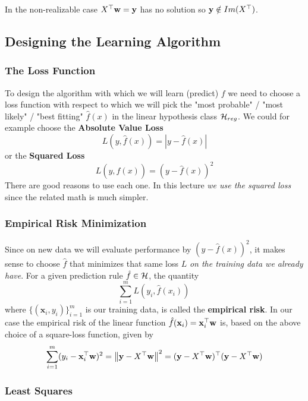 In the non-realizable case $X^{\top} \mathbf{w}=\mathbf{y}$ has no solution so $\mathbf{y}\notin Im(X^{\top})$.





\subsection{Designing the Learning Algorithm}

\subsubsection{The Loss Function}

To design the algorithm with which we will learn (predict) $f$ we need to choose a loss function with respect to which we will pick the "most probable" / "most likely" / "best fitting" $\hat{f}(x)$ in the linear hypothesis class $\mathcal{H}_{reg}$. We could for example choose the \textbf{Absolute Value Loss}
     \[
      L(y,\hat{f}(x)) = |y - \hat{f}(x)|
     \]
     or the \textbf{Squared Loss}
     \[
      L(y,\hat{f}(x)) = (y - \hat{f}(x))^2
     \]
There are good reasons to use each one. In this lecture \textit{we use the squared loss} since the related math is much simpler.



\subsubsection{Empirical Risk Minimization}

Since on new data we will evaluate performance by $(y-\hat{f}(x))^2$, it makes sense to choose $\hat{f}$ that minimizes that same loss $L$ \textit{on the training data we already have}.
 For a given prediction rule $\hat{f}\in\mathcal{H}$, the quantity
  \[
   \sum_{i=1}^m L(y_i,\hat{f}(x_i))\,
   \]
where $\{(\mathbf{x}_i,y_i)\}_{i=1}^m$ is our training data, is called the \textbf{empirical risk}. In our case the empirical risk of the linear function
   $\hat{f}(\mathbf{x}_i)=\mathbf{x}_i^{\top}\mathbf{w}$ is,  based on the above choice of a square-loss function, given by
   \[
   \sum_{i=1}^m(y_i-\mathbf{x}_i^{\top}\mathbf{w})^2 = \left\| \mathbf{y}-X^{\top}\mathbf{w}\right\|^2 =
   (\mathbf{y}-X^{\top}\mathbf{w})^{\top}(\mathbf{y}-X^{\top}\mathbf{w})
   \]

\subsubsection{Least Squares}

